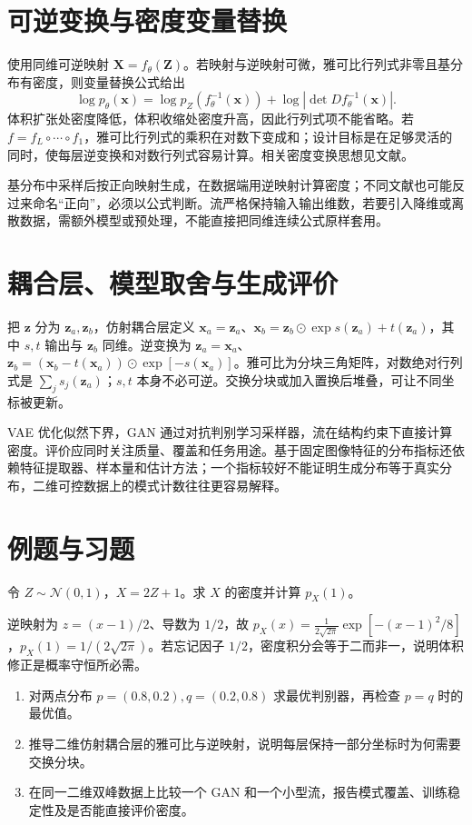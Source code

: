 \documentclass[UTF8,12pt,a4paper,fontset=fandol]{ctexbook}
\begin{document}
\section{可逆变换与密度变量替换}
使用同维可逆映射 $\mathbf X=f_\theta(\mathbf Z)$。若映射与逆映射可微，雅可比行列式非零且基分布有密度，则变量替换公式给出
\begin{equation}
\log p_\theta(\mathbf x)=\log p_Z(f_\theta^{-1}(\mathbf x))
+\log|\det Df_\theta^{-1}(\mathbf x)|.
\label{eq:dl-flow-density}
\end{equation}
体积扩张处密度降低，体积收缩处密度升高，因此行列式项不能省略。若 $f=f_L\circ\cdots\circ f_1$，雅可比行列式的乘积在对数下变成和；设计目标是在足够灵活的同时，使每层逆变换和对数行列式容易计算。相关密度变换思想见文献\cite{rezende2015}。

基分布中采样后按正向映射生成，在数据端用逆映射计算密度；不同文献也可能反过来命名“正向”，必须以公式判断。流严格保持输入输出维数，若要引入降维或离散数据，需额外模型或预处理，不能直接把同维连续公式原样套用。

\section{耦合层、模型取舍与生成评价}
把 $\mathbf z$ 分为 $\mathbf z_a,\mathbf z_b$，仿射耦合层定义 $\mathbf x_a=\mathbf z_a$、$\mathbf x_b=\mathbf z_b\odot\exp s(\mathbf z_a)+t(\mathbf z_a)$，其中 $s,t$ 输出与 $\mathbf z_b$ 同维。逆变换为 $\mathbf z_a=\mathbf x_a$、$\mathbf z_b=(\mathbf x_b-t(\mathbf x_a))\odot\exp[-s(\mathbf x_a)]$。雅可比为分块三角矩阵，对数绝对行列式是 $\sum_js_j(\mathbf z_a)$；$s,t$ 本身不必可逆。交换分块或加入置换后堆叠，可让不同坐标被更新。

VAE 优化似然下界，GAN 通过对抗判别学习采样器，流在结构约束下直接计算密度。评价应同时关注质量、覆盖和任务用途。基于固定图像特征的分布指标还依赖特征提取器、样本量和估计方法；一个指标较好不能证明生成分布等于真实分布，二维可控数据上的模式计数往往更容易解释。

\section{例题与习题}
\begin{example}[缩放的密度修正]
令 $Z\sim\mathcal N(0,1)$，$X=2Z+1$。求 $X$ 的密度并计算 $p_X(1)$。
\end{example}
\begin{solve}
逆映射为 $z=(x-1)/2$、导数为 $1/2$，故 $p_X(x)=\frac1{2\sqrt{2\pi}}\exp[-(x-1)^2/8]$，$p_X(1)=1/(2\sqrt{2\pi})$。若忘记因子 $1/2$，密度积分会等于二而非一，说明体积修正是概率守恒所必需。
\end{solve}
\begin{enumerate}
\item 对两点分布 $p=(0.8,0.2),q=(0.2,0.8)$ 求最优判别器，再检查 $p=q$ 时的最优值。
\item 推导二维仿射耦合层的雅可比与逆映射，说明每层保持一部分坐标时为何需要交换分块。
\item 在同一二维双峰数据上比较一个 GAN 和一个小型流，报告模式覆盖、训练稳定性及是否能直接评价密度。
\end{enumerate}
\end{document}
